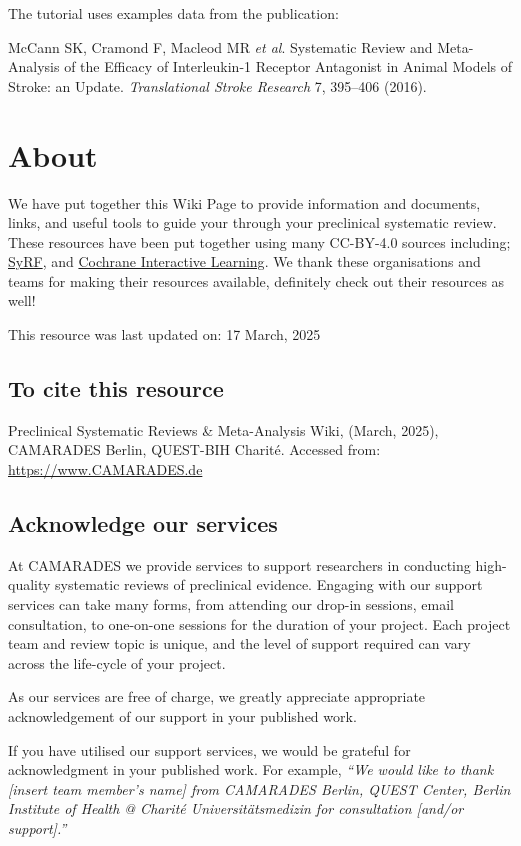 \documentclass[
]{book}
\begin{document}
The tutorial uses examples data from the publication:

McCann SK, Cramond F, Macleod MR \emph{et al}. Systematic Review and
Meta-Analysis of the Efficacy of Interleukin-1 Receptor Antagonist in
Animal Models of Stroke: an Update. \emph{Translational Stroke Research} 7, 395--406 (2016).

\chapter{About}\label{about}

We have put together this Wiki Page to provide information and documents, links, and useful tools to guide your through your preclinical systematic review. These resources have been put together using many CC-BY-4.0 sources including; \href{https://syrf.org.uk/}{SyRF}, and \href{https://training.cochrane.org/interactivelearning}{Cochrane Interactive Learning}. We thank these organisations and teams for making their resources available, definitely check out their resources as well!

This resource was last updated on: 17 March, 2025

\section{To cite this resource}\label{to-cite-this-resource}

Preclinical Systematic Reviews \& Meta-Analysis Wiki, (March, 2025), CAMARADES Berlin, QUEST-BIH Charité. Accessed from: \url{https://www.CAMARADES.de}

\section{Acknowledge our services}\label{acknowledge-our-services}

At CAMARADES we provide services to support researchers in conducting high-quality systematic reviews of preclinical evidence. Engaging with our support services can take many forms, from attending our drop-in sessions, email consultation, to one-on-one sessions for the duration of your project. Each project team and review topic is unique, and the level of support required can vary across the life-cycle of your project.

As our services are free of charge, we greatly appreciate appropriate acknowledgement of our support in your published work.

If you have utilised our support services, we would be grateful for acknowledgment in your published work. For example, \emph{``We would like to thank {[}insert team member's name{]} from CAMARADES Berlin, QUEST Center, Berlin Institute of Health @ Charité Universitätsmedizin for consultation {[}and/or support{]}.''}
\end{document}
